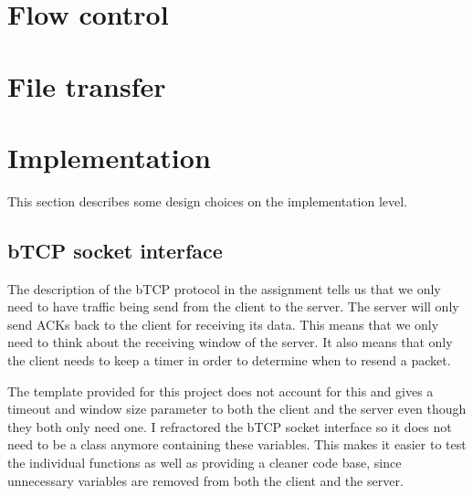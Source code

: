 \documentclass[a4paper]{article}
\begin{document}
\section{Flow control}

\section{File transfer}

\section{Implementation}
This section describes some design choices on the implementation level.

	\subsection{bTCP socket interface}
	The description of the bTCP protocol in the assignment tells us that we only need to have traffic being send from the client to the server. The server will only send ACKs back to the client for receiving its data. This means that we only need to think about the receiving window of the server. It also means that only the client needs to keep a timer in order to determine when to resend a packet.

	The template provided for this project does not account for this and gives a timeout and window size parameter to both the client and the server even though they both only need one. I refractored the bTCP socket interface so it does not need to be a class anymore containing these variables. This makes it easier to test the individual functions as well as providing a cleaner code base, since unnecessary variables are removed from both the client and the server.
\end{document}
